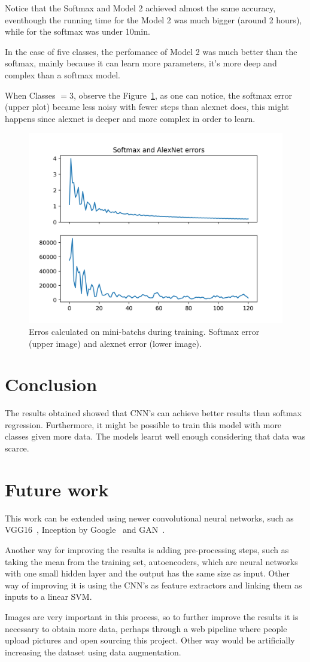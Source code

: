 \documentclass{article}
\begin{document}
  Notice that the Softmax and Model 2 achieved almost the same accuracy, eventhough
  the running time for the Model 2 was much bigger (around 2 hours), while
  for the softmax was under 10min.

  In the case of five classes, the perfomance of Model 2 was much better than the
  softmax, mainly because it can learn more parameters, it's more deep and complex
  than a softmax model.

  When Classes $= 3$, observe the Figure~\ref{fig:errorsoft}, as one can notice,
  the softmax error (upper plot) became less noisy with fewer steps than alexnet does,
  this might happens since alexnet is deeper and more complex in order to learn.
  \begin{figure}[htb]
    \centering
    \includegraphics[width=.48\textwidth]{errors.png}
    \caption{Erros calculated on mini-batchs during training. Softmax error
    (upper image) and alexnet error (lower image).}
    \label{fig:errorsoft}
  \end{figure}

\section{Conclusion}
  The results obtained showed that CNN's can achieve better results than
  softmax regression. Furthermore, it might be possible to train this model
  with more classes given more data. The models learnt well enough
  considering that data was scarce.

\section{Future work}
  This work can be extended using newer convolutional neural networks, such
  as VGG16~\cite{vgg16}, Inception by Google~\cite{inception} and GAN~\cite{
  gan}.

  Another way for improving the results is adding pre-processing steps, such as
  taking the mean from the training set, autoencoders, which are neural networks
  with one small hidden layer and the output has the same size as input. Other
  way of improving it is using the CNN's as feature extractors and linking
  them as inputs to a linear SVM.

  Images are very important in this process, so to further improve the results
  it is necessary to obtain more data, perhaps through a web pipeline where
  people upload pictures and open sourcing this project. Other way would be
  artificially increasing the dataset using data augmentation.



\end{document}
